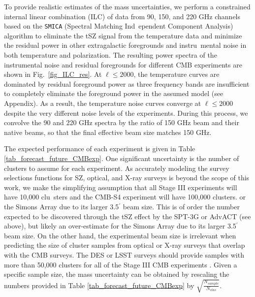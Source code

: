 To provide realistic estimates of the mass uncertainties, we perform a constrained internal linear combination (ILC) of data from 90, 150, and 220 GHz channels based on the \texttt{SMICA} (Spectral Matching Ind\
ependent Component Analysis) algorithm \citep{smicacardoso, PLANCKCOMPSEP2014} to eliminate the tSZ signal from the temperature data and minimize the residual power in other extragalactic foregrounds and instru\
mental noise in both temperature and polarization.
The resulting power spectra of the instrumental noise and residual foregrounds for different CMB experiments are shown in Fig.~\ref{fig_ILC_res}.
At $\ell \le 2000$, the temperature curves are dominated by residual foreground power as three frequency bands are insufficient to completely eliminate the foreground power in the assumed model (see Appendix).
As a result, the temperature noise curves  converge at $\ell \le 2000$ despite the very different noise levels of the  experiments.
During this process, we convolve the 90 and 220 GHz spectra by the ratio of 150 GHz beam and their native beams, so that the final effective beam size matches 150 GHz.

The expected performance of each  experiment is given in Table \ref{tab_forecast_future_CMBexp}.
One significant uncertainty is the number of clusters to assume for each experiment.
As accurately modeling the survey selections functions for SZ, optical, and X-ray surveys is beyond the scope of this work, we make the simplifying assumption that all Stage III experiments will have 10,000 clu\
sters and the CMB-S4 experiment will have 100,000 clusters.
or the Simons Array due to its larger 3.5$^\prime$ beam size.                                                                                                                                                      
This is of order the number expected to be discovered through the tSZ effect by the SPT-3G or AdvACT (see above), but likely an over-estimate for the Simons Array due to its larger 3.5$^\prime$ beam size.
On the other hand, the experimental beam size is irrelevant when predicting the size of cluster samples from optical or X-ray surveys that overlap with the CMB surveys.
The DES or LSST surveys should provide samples with more than 50,000 clusters for all of the Stage III CMB experiments \citep{rykoff2016, lsst_science_book}.
Given a specific sample size, the mass uncertainty can be obtained by rescaling the numbers provided in Table \ref{tab_forecast_future_CMBexp} by $\sqrt{\frac{N_{sample}}{N_{clus}}}$.

